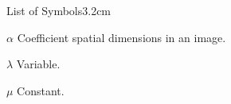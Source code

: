 


\begin{mclistof}{List of Symbols}{3.2cm}

\item[$\alpha$] Coefficient spatial dimensions in an image.

\item[$\lambda$] Variable.

\item[$\mu$] Constant.



\end{mclistof} 